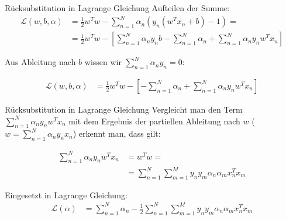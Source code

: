 \documentclass[ngerman]{beamer}
\newcommand{\Lagr}{\mathcal{L}}
\begin{document}
\begin{frame}{Rücksubstitution in Lagrange Gleichung}
Aufteilen der Summe:
\begin{equation*}
	\begin{aligned}
		\Lagr(w, b, \alpha) &= \frac{1}{2} w^{T} w - \sum_{n=1}^{N} \alpha_{n} (y_n (w^{T} x_{n} + b)-1) = \\
		&= \frac{1}{2} w^{T} w - [\sum_{n=1}^{N} \alpha_{n} y_{n} b - \sum_{n=1}^{N} \alpha_{n} + \sum_{n=1}^{N} \alpha_{n} y_{n} w^{T} x_{n}]
	\end{aligned}
\end{equation*}

Aus Ableitung nach $b$ wissen wir $\sum_{n=1}^{N} \alpha_{n} y_{n} = 0$:

\begin{equation*}
	\begin{aligned}
		\Lagr(w, b, \alpha) &= \frac{1}{2} w^{T} w - [-\sum_{n=1}^{N} \alpha_{n} + \sum_{n=1}^{N} \alpha_{n} y_{n} w^{T} x_{n}]
	\end{aligned}
\end{equation*}

\end{frame}


\begin{frame}{Rücksubstitution in Lagrange Gleichung}
Vergleicht man den Term $\sum_{n=1}^{N} \alpha_{n} y_{n} w^{T} x_{n}$ mit dem Ergebnis der partiellen Ableitung nach $w$ ($w = \sum_{n=1}^{N} \alpha_{n} y_{n} x_{n}$) erkennt man, dass gilt:

\begin{equation*}
	\begin{aligned}
		\sum_{n=1}^{N} \alpha_{n} y_{n} w^{T} x_{n} &= w^T w = \\
		&= \sum_{n=1}^{N} \sum_{m=1}^{M} y_{n} y_{m} \alpha_{n} \alpha_{m} x_{n}^{T} x_{m}
	\end{aligned}
\end{equation*}

Eingesetzt in Lagrange Gleichung:
\begin{equation*}
	\begin{aligned}
		\Lagr(\alpha) &= \sum_{n=1}^{N }\alpha_{n} - \frac{1}{2} \sum_{n=1}^{N} \sum_{m=1}^{M} y_{n} y_{m} \alpha_{n} \alpha_{m} x_{n}^{T} x_{m}
	\end{aligned}
\end{equation*}

\end{frame}
\end{document}
